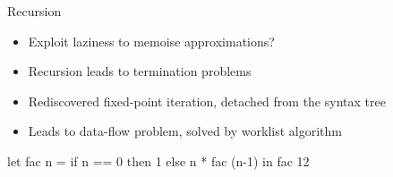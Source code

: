 \documentclass{haskellbeamer}
\begin{document}
\begin{frame}[fragile]{Recursion}
  \begin{itemize}
    \item Exploit laziness to memoise approximations?
    \item[\xmark] Recursion leads to termination problems
    \item Rediscovered fixed-point iteration, detached from the syntax tree
    \item Leads to data-flow problem, solved by worklist algorithm
  \end{itemize}
  \begin{center}
    \begin{minipage}{0.5\textwidth}
      \begin{haskell}
        let fac n = 
              if n == 0
                then 1
                else n * fac (n-1)
        in fac 12
      \end{haskell}
    \end{minipage}
  \end{center}
\end{frame}
\end{document}
